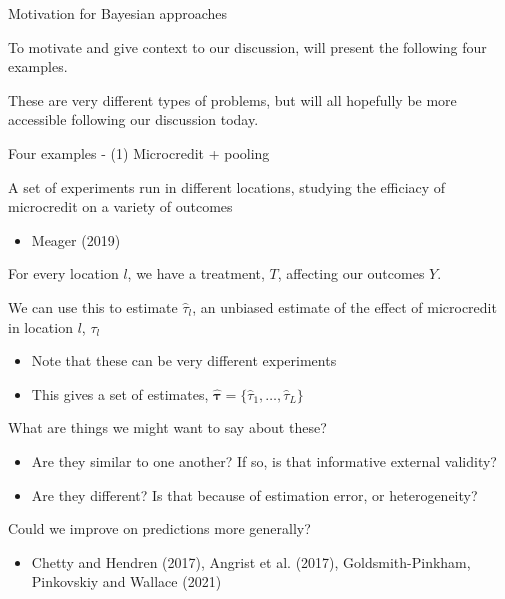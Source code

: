 \documentclass[notes,11pt, aspectratio=169]{beamer}
\newenvironment{wideitemize}{\itemize\addtolength{\itemsep}{10pt}}{\enditemize}
\begin{document}
\begin{frame}{Motivation for Bayesian approaches}
  \begin{wideitemize}
  \item To motivate and give context to our discussion, will present the
    following four examples.
  \item These are very different types of problems, but will all
    hopefully be more accessible following our discussion today.
  \end{wideitemize}
\end{frame}
\begin{frame}{Four examples - (1) Microcredit + pooling}
  \begin{wideitemize}
  \item A set of experiments run in different locations, studying the
    efficiacy of microcredit on a variety of outcomes
    \begin{itemize}
    \item Meager (2019)
    \end{itemize}
  \item For every location $l$, we have a treatment, $T$,
    affecting our outcomes $Y$.
  \item We can use this to estimate $\hat{\tau}_{l}$, an unbiased
    estimate of the effect of microcredit in location $l$, $\tau_{l}$
    \begin{itemize}
    \item Note that these can be very different experiments
    \item This gives a set of estimates, $\boldsymbol{\hat{\tau}} = \{\hat{\tau}_{1},\ldots, \hat{\tau}_{L}\}$
    \end{itemize}
  \item What are things we might want to say about these?
    \begin{itemize}
    \item Are they similar to one another? If so, is that informative external validity?
    \item Are they different? Is that because of estimation error, or heterogeneity?
    \end{itemize}
  \item Could we improve on predictions more generally?
    \begin{itemize}
     \item Chetty and Hendren (2017), Angrist et al. (2017),
      Goldsmith-Pinkham, Pinkovskiy and Wallace (2021)
    \end{itemize}
  \end{wideitemize}
\end{frame}
\end{document}
